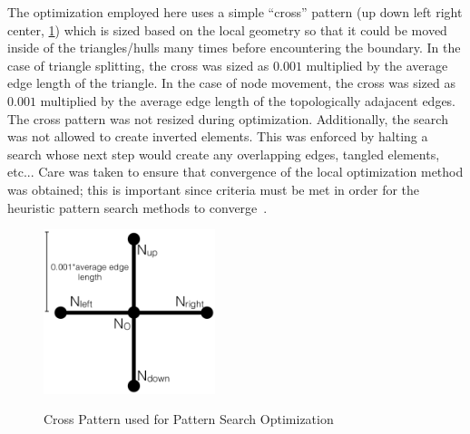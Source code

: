 The optimization employed here uses a simple ``cross'' pattern (up down
left right center, \ref{crossPattern}) which is sized based on the
local geometry so that it could be moved inside of the triangles/hulls
many times before encountering the boundary. In the case of triangle
splitting, the cross was sized as $0.001$ multiplied by the average edge
length of the triangle. In the case of node movement, the cross was
sized as $0.001$ multiplied by the average edge length of the
topologically adajacent edges. The cross pattern was not resized during
optimization.  Additionally, the search was not allowed to create
inverted elements.  This was enforced by halting a search whose next
step would create any overlapping edges, tangled elements, etc... Care
was taken to ensure that convergence of the local optimization method
was obtained; this is important since criteria must be met in order for
the heuristic pattern search methods to
converge~\cite{patternsearch2,patternsearch3}.

\begin{figure}
  \begin{center}
  \label{crossPattern}
  \includegraphics[width=50mm]{Figures/crossPattern.png}
  \caption{Cross Pattern used for Pattern Search Optimization}
  \end{center}
\end{figure}
